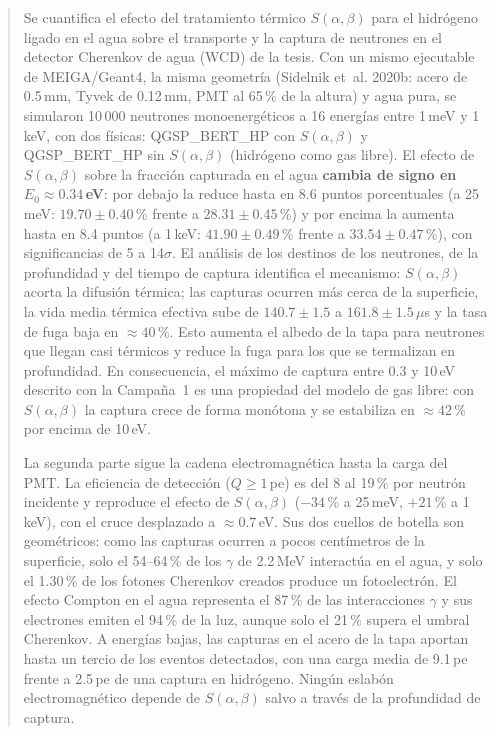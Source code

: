 \documentclass[11pt,a4paper]{article}
\newcommand{\sab}{$S(\alpha,\beta)$}
\begin{document}
\begin{abstract}
Se cuantifica el efecto del tratamiento térmico \sab{} para el hidrógeno ligado en el agua sobre el transporte y la captura de neutrones en el detector Cherenkov de agua (WCD) de la tesis. Con un mismo ejecutable de MEIGA/Geant4, la misma geometría (Sidelnik et~al. 2020b: acero de 0.5\,mm, Tyvek de 0.12\,mm, PMT al 65\,\% de la altura) y agua pura, se simularon 10\,000 neutrones monoenergéticos a 16 energías entre 1\,meV y 1\,keV, con dos físicas: QGSP\_BERT\_HP con \sab{} y QGSP\_BERT\_HP sin \sab{} (hidrógeno como gas libre). El efecto de \sab{} sobre la fracción capturada en el agua \textbf{cambia de signo en $E_0\approx0.34$\,eV}: por debajo la reduce hasta en 8.6 puntos porcentuales (a 25\,meV: $19.70\pm0.40$\,\% frente a $28.31\pm0.45$\,\%) y por encima la aumenta hasta en 8.4 puntos (a 1\,keV: $41.90\pm0.49$\,\% frente a $33.54\pm0.47$\,\%), con significancias de 5 a 14$\sigma$. El análisis de los destinos de los neutrones, de la profundidad y del tiempo de captura identifica el mecanismo: \sab{} acorta la difusión térmica; las capturas ocurren más cerca de la superficie, la vida media térmica efectiva sube de $140.7\pm1.5$ a $161.8\pm1.5\,\mu$s y la tasa de fuga baja en $\approx40$\,\%. Esto aumenta el albedo de la tapa para neutrones que llegan casi térmicos y reduce la fuga para los que se termalizan en profundidad. En consecuencia, el máximo de captura entre 0.3 y 10\,eV descrito con la Campaña~1 es una propiedad del modelo de gas libre: con \sab{} la captura crece de forma monótona y se estabiliza en $\approx42$\,\% por encima de 10\,eV.

La segunda parte sigue la cadena electromagnética hasta la carga del PMT. La eficiencia de detección ($Q\geq1$\,pe) es del 8 al 19\,\% por neutrón incidente y reproduce el efecto de \sab{} ($-34$\,\% a 25\,meV, $+21$\,\% a 1\,keV), con el cruce desplazado a $\approx0.7$\,eV. Sus dos cuellos de botella son geométricos: como las capturas ocurren a pocos centímetros de la superficie, solo el 54--64\,\% de los $\gamma$ de 2.2\,MeV interactúa en el agua, y solo el 1.30\,\% de los fotones Cherenkov creados produce un fotoelectrón. El efecto Compton en el agua representa el 87\,\% de las interacciones $\gamma$ y sus electrones emiten el 94\,\% de la luz, aunque solo el 21\,\% supera el umbral Cherenkov. A energías bajas, las capturas en el acero de la tapa aportan hasta un tercio de los eventos detectados, con una carga media de 9.1\,pe frente a 2.5\,pe de una captura en hidrógeno. Ningún eslabón electromagnético depende de \sab{} salvo a través de la profundidad de captura.
\end{abstract}
\end{document}
